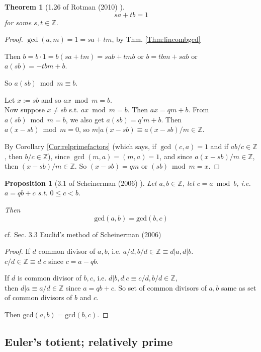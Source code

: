 \documentclass[10pt]{amsart}
\newtheorem{theorem}{Theorem}
\newtheorem{proposition}{Proposition}
\begin{document}
\begin{multicols*}{2}
\begin{theorem}[1.26 of Rotman (2010) \cite{JRotman2010}]
\[
sa + tb =1
\]
for some $s,t\in \mathbb{Z}$.  
\end{theorem}
\begin{proof}
$\gcd(a,m) = 1=sa+tm$, by Thm. \ref{Thm:lincombgcd}   

Then $b=b\cdot 1=  b(sa+tm) = sab+tmb$ or $b=tbm+sab$ or $a(sb) = -tbm + b$.  

So $a(sb)\bmod{m}  \equiv b$.  

Let $x:= sb$ and so $ax \bmod{m}=b$.   \\
Now suppose $x \neq sb$ s.t. $ax\bmod{m}=b$.  Then $ax=qm +b$.  From $a(sb) \bmod{m}=b$, we also get $a(sb) = q'm + b$.  Then $a(x-sb) \bmod{m}=0$, so $m|a(x-sb) \equiv a(x-sb)/m\in \mathbb{Z}$.  

By Corollary \ref{Cor:relprimefactors} (which says, if $\gcd(c,a)=1$ and if $ab/c\in\mathbb{Z}$, then $b/c \in \mathbb{Z}$), 
since $\gcd(m,a) = (m,a)=1$, and since $a(x-sb)/m \in \mathbb{Z}$, then $(x-sb)/m\in\mathbb{Z}$.  So $(x-sb)=qm$ or $(sb)\bmod{m} = x$.  


\end{proof}



\begin{proposition}[3.1 of Scheinerman (2006) \cite{Sche2006}]\label{Prop:commongcd}
Let $a,b\in \mathbb{Z}$, let $c=a\bmod{b}$, i.e. $a=qb+c$ s.t. $0\leq c <b$.  

Then 
\begin{equation}
\text{gcd}(a,b) = \text{gcd}(b,c)
\end{equation}
\end{proposition}
cf. Sec. 3.3 Euclid's method of Scheinerman (2006) \cite{Sche2006}

\begin{proof}
If $d$ common divisor of $a,b$, i.e. $a/d, b/d \in \mathbb{Z} \equiv d|a, d|b$.   \\
$c/d \in \mathbb{Z} \equiv d|c$ since $c=a-qb$.  

If $d$ is common divisor of $b,c$, i.e. $d|b, d|c \equiv c/d, b/d\in\mathbb{Z}$, \\
then $d|a \equiv a/d \in \mathbb{Z}$ since $a=qb+c$.  So set of common divisors of $a,b$ same as set of common divisors of $b$ and $c$.  

Then $\text{gcd}(a,b) = \text{gcd}(b,c)$.  
\end{proof}




\subsection{Euler's totient; relatively prime}


\end{multicols*}
\end{document}
